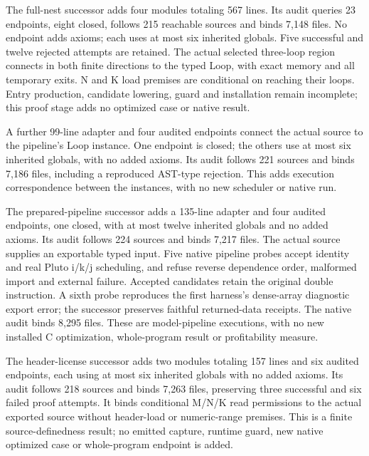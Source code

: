 The full-nest successor adds four modules totaling 567 lines. Its audit queries
23 endpoints, eight closed, follows 215 reachable sources and binds 7,148 files.
No endpoint adds axioms; each uses at most six inherited globals. Five successful
and twelve rejected attempts are retained. The actual selected three-loop region
connects in both finite directions to the typed Loop, with exact memory and all
temporary exits. N and K load premises are conditional on reaching their loops.
Entry production, candidate lowering, guard and installation remain incomplete;
this proof stage adds no optimized case or native result.

A further 99-line adapter and four audited endpoints connect the actual source
to the pipeline's Loop instance. One endpoint is closed; the others use at most
six inherited globals, with no added axioms. Its audit follows 221 sources and
binds 7,186 files, including a reproduced AST-type rejection. This adds execution
correspondence between the instances, with no new scheduler or native run.

The prepared-pipeline successor adds a 135-line adapter and four audited
endpoints, one closed, with at most twelve inherited globals and no added
axioms. Its audit follows 224 sources and binds 7,217 files. The actual source
supplies an exportable typed input. Five native pipeline probes accept identity
and real Pluto i/k/j scheduling, and refuse reverse dependence order, malformed
import and external failure. Accepted candidates retain the original double
instruction. A sixth probe reproduces the first harness's dense-array
diagnostic export error; the successor preserves faithful returned-data receipts.
The native audit binds 8,295 files. These are model-pipeline executions, with
no new installed C optimization, whole-program result or profitability measure.

The header-license successor adds two modules totaling 157 lines and six
audited endpoints, each using at most six inherited globals with no added
axioms. Its audit follows 218 sources and binds 7,263 files, preserving three
successful and six failed proof attempts. It binds conditional M/N/K read
permissions to the actual exported source without header-load or numeric-range
premises. This is a finite source-definedness result; no emitted capture,
runtime guard, new native optimized case or whole-program endpoint is added.

